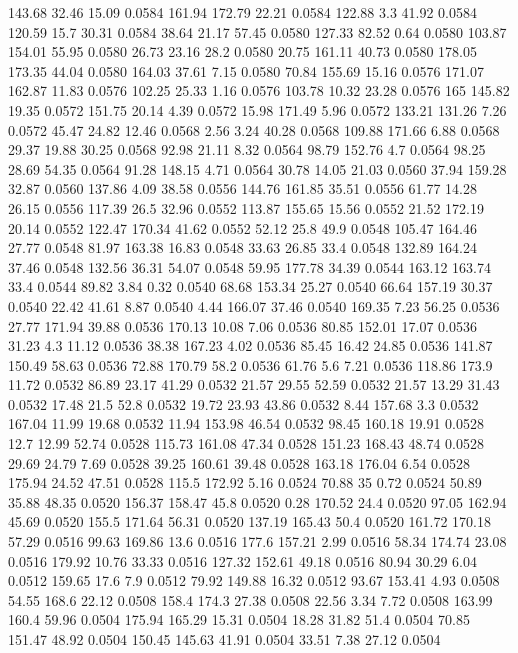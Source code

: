 143.68	32.46	15.09	0.0584
161.94	172.79	22.21	0.0584
122.88	3.3	41.92	0.0584
120.59	15.7	30.31	0.0584
38.64	21.17	57.45	0.0580
127.33	82.52	0.64	0.0580
103.87	154.01	55.95	0.0580
26.73	23.16	28.2	0.0580
20.75	161.11	40.73	0.0580
178.05	173.35	44.04	0.0580
164.03	37.61	7.15	0.0580
70.84	155.69	15.16	0.0576
171.07	162.87	11.83	0.0576
102.25	25.33	1.16	0.0576
103.78	10.32	23.28	0.0576
165	145.82	19.35	0.0572
151.75	20.14	4.39	0.0572
15.98	171.49	5.96	0.0572
133.21	131.26	7.26	0.0572
45.47	24.82	12.46	0.0568
2.56	3.24	40.28	0.0568
109.88	171.66	6.88	0.0568
29.37	19.88	30.25	0.0568
92.98	21.11	8.32	0.0564
98.79	152.76	4.7	0.0564
98.25	28.69	54.35	0.0564
91.28	148.15	4.71	0.0564
30.78	14.05	21.03	0.0560
37.94	159.28	32.87	0.0560
137.86	4.09	38.58	0.0556
144.76	161.85	35.51	0.0556
61.77	14.28	26.15	0.0556
117.39	26.5	32.96	0.0552
113.87	155.65	15.56	0.0552
21.52	172.19	20.14	0.0552
122.47	170.34	41.62	0.0552
52.12	25.8	49.9	0.0548
105.47	164.46	27.77	0.0548
81.97	163.38	16.83	0.0548
33.63	26.85	33.4	0.0548
132.89	164.24	37.46	0.0548
132.56	36.31	54.07	0.0548
59.95	177.78	34.39	0.0544
163.12	163.74	33.4	0.0544
89.82	3.84	0.32	0.0540
68.68	153.34	25.27	0.0540
66.64	157.19	30.37	0.0540
22.42	41.61	8.87	0.0540
4.44	166.07	37.46	0.0540
169.35	7.23	56.25	0.0536
27.77	171.94	39.88	0.0536
170.13	10.08	7.06	0.0536
80.85	152.01	17.07	0.0536
31.23	4.3	11.12	0.0536
38.38	167.23	4.02	0.0536
85.45	16.42	24.85	0.0536
141.87	150.49	58.63	0.0536
72.88	170.79	58.2	0.0536
61.76	5.6	7.21	0.0536
118.86	173.9	11.72	0.0532
86.89	23.17	41.29	0.0532
21.57	29.55	52.59	0.0532
21.57	13.29	31.43	0.0532
17.48	21.5	52.8	0.0532
19.72	23.93	43.86	0.0532
8.44	157.68	3.3	0.0532
167.04	11.99	19.68	0.0532
11.94	153.98	46.54	0.0532
98.45	160.18	19.91	0.0528
12.7	12.99	52.74	0.0528
115.73	161.08	47.34	0.0528
151.23	168.43	48.74	0.0528
29.69	24.79	7.69	0.0528
39.25	160.61	39.48	0.0528
163.18	176.04	6.54	0.0528
175.94	24.52	47.51	0.0528
115.5	172.92	5.16	0.0524
70.88	35	0.72	0.0524
50.89	35.88	48.35	0.0520
156.37	158.47	45.8	0.0520
0.28	170.52	24.4	0.0520
97.05	162.94	45.69	0.0520
155.5	171.64	56.31	0.0520
137.19	165.43	50.4	0.0520
161.72	170.18	57.29	0.0516
99.63	169.86	13.6	0.0516
177.6	157.21	2.99	0.0516
58.34	174.74	23.08	0.0516
179.92	10.76	33.33	0.0516
127.32	152.61	49.18	0.0516
80.94	30.29	6.04	0.0512
159.65	17.6	7.9	0.0512
79.92	149.88	16.32	0.0512
93.67	153.41	4.93	0.0508
54.55	168.6	22.12	0.0508
158.4	174.3	27.38	0.0508
22.56	3.34	7.72	0.0508
163.99	160.4	59.96	0.0504
175.94	165.29	15.31	0.0504
18.28	31.82	51.4	0.0504
70.85	151.47	48.92	0.0504
150.45	145.63	41.91	0.0504
33.51	7.38	27.12	0.0504
